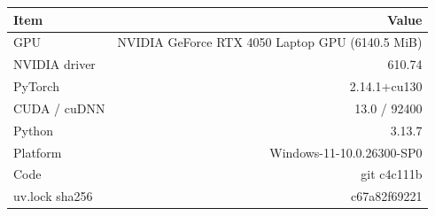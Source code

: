\begin{tabular}{lr}
\toprule
Item & Value \\
\midrule
GPU & NVIDIA GeForce RTX 4050 Laptop GPU (6140.5 MiB) \\
NVIDIA driver & 610.74 \\
PyTorch & 2.14.1+cu130 \\
CUDA / cuDNN & 13.0 / 92400 \\
Python & 3.13.7 \\
Platform & Windows-11-10.0.26300-SP0 \\
Code & git c4c111b \\
uv.lock sha256 & c67a82f69221 \\
\bottomrule
\end{tabular}
\par{}
